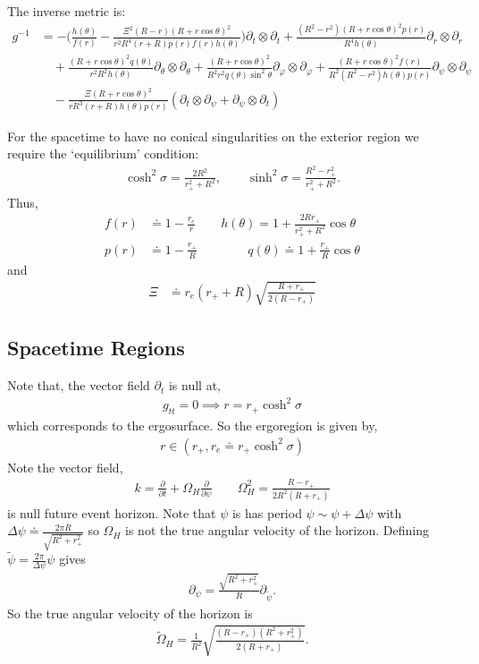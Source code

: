 \documentclass[11pt]{article}
\renewcommand{\phi}{\varphi}
\begin{document}
 The inverse metric is: 
 \begin{align}
 g^{-1}&=-\Big(\frac{h(\theta)}{f(r)}-\frac{\Xi^2(R-r)(R+r\cos\theta)^2}{r^2R^4(r+R)p(r)f(r)h(\theta)}\Big)\partial_t\otimes\partial_t+\frac{(R^2-r^2)(R+r\cos\theta)^2p(r)}{R^4h(\theta)}\partial_r\otimes\partial_r\\
 &\nonumber\quad+\frac{(R+r\cos\theta)^2q(\theta)}{r^2R^2h(\theta)}\partial_{\theta}\otimes\partial_{\theta}+\frac{(R+r\cos\theta)^2}{R^2r^2q(\theta)\sin^2\theta}\partial_{\phi}\otimes\partial_{\phi}+\frac{(R+r\cos\theta)^2f(r)}{R^2(R^2-r^2)h(\theta)p(r)}\partial_{\psi}\otimes\partial_{\psi}\nonumber\\
 &\nonumber\quad-\frac{\Xi(R+r\cos\theta)^2}{rR^3(r+R)h(\theta)p(r)}(\partial_{t}\otimes\partial_{\psi}+\partial_{\psi}\otimes\partial_t)\nonumber
 \end{align}
 
  For the spacetime to have no conical singularities on the exterior region we require the `equilibrium' condition:
 \begin{align}
 \cosh^2\sigma=\frac{2R^2}{r_+^2+R^2},\qquad \sinh^2\sigma=\frac{R^2-r_+^2}{r_+^2+R^2}.
 \end{align}
 Thus, 
 \begin{align}
 f(r)&\doteq1-\frac{r_e}{r}\qquad h(\theta)=1+\frac{2Rr_+}{r_+^2+R^2}\cos\theta\\
 p(r)&\doteq1-\frac{r_+}{R}\qquad \qquad q(\theta)\doteq1+\frac{r_+}{R}\cos\theta
 \end{align}
 and
 \begin{align}
 \Xi&\doteq r_e(r_++R)\sqrt{\frac{R+r_+}{2(R-r_+)}}
 \end{align}
 \subsection{Spacetime Regions}
Note that, the vector field $\partial_t$ is null at,
 \begin{align}
 g_{tt}=0\implies r=r_+\cosh^2\sigma
 \end{align}
 which corresponds to the ergosurface. So the ergoregion is given by, 
 \begin{align}
 r\in (r_+,r_e\doteq r_+\cosh^2\sigma)
 \end{align}
 Note the vector field, 
 \begin{align}
 k=\frac{\partial}{\partial t}+\Omega_H\frac{\partial}{\partial\psi} \qquad \Omega_H^2=\frac{R-r_+}{2R^2(R+r_+)}
 \end{align}
is null future event horizon. Note that $\psi$ is has period $\psi\sim \psi+\Delta\psi$ with $\Delta\psi\doteq\frac{2\pi R}{\sqrt{R^2+r_+^2}}$ so $\Omega_H$ is not the true angular velocity of the horizon. Defining $\tilde{\psi}=\frac{2\pi}{\Delta\psi}\psi$ gives
\begin{align}
\partial_{\psi}=\frac{\sqrt{R^2+r_+^2}}{R}\partial_{\tilde{\psi}}. 
\end{align}
So the true angular velocity of the horizon is
\begin{align}
\tilde{\Omega}_H=\frac{1}{R^2}\sqrt{\frac{(R-r_+)(R^2+r_+^2)}{2(R+r_+)}}.
\end{align}
\end{document}
